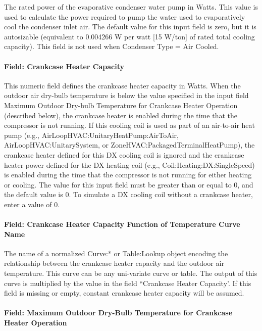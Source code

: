 The rated power of the evaporative condenser water pump in Watts. This value is used to calculate the power required to pump the water used to evaporatively cool the condenser inlet air. The default value for this input field is zero, but it is autosizable (equivalent to 0.004266 W per watt {[}15 W/ton{]} of rated total cooling capacity). This field is not used when Condenser Type = Air Cooled.

\paragraph{Field: Crankcase Heater Capacity}\label{field-crankcase-heater-capacity-3}

This numeric field defines the crankcase heater capacity in Watts. When the outdoor air dry-bulb temperature is below the value specified in the input field Maximum Outdoor Dry-bulb Temperature for Crankcase Heater Operation (described below), the crankcase heater is enabled during the time that the compressor is not running. If this cooling coil is used as part of an air-to-air heat pump (e.g., AirLoopHVAC:UnitaryHeatPump:AirToAir, AirLoopHVAC:UnitarySystem, or ZoneHVAC:PackagedTerminalHeatPump), the crankcase heater defined for this DX cooling coil is ignored and the crankcase heater power defined for the DX heating coil (e.g., Coil:Heating:DX:SingleSpeed) is enabled during the time that the compressor is not running for either heating or cooling. The value for this input field must be greater than or equal to 0, and the default value is 0. To simulate a DX cooling coil without a crankcase heater, enter a value of 0.

\paragraph{Field: Crankcase Heater Capacity Function of Temperature Curve Name}

The name of a normalized Curve:* or Table:Lookup object encoding the relationship between the crankcase heater capacity and the outdoor air temperature. This curve can be any uni-variate curve or table. The output of this curve is multiplied by the value in the field ``Crankcase Heater Capacity'. If this field is missing or empty, constant crankcase heater capacity will be
assumed.

\paragraph{Field: Maximum Outdoor Dry-Bulb Temperature for Crankcase Heater Operation}\label{field-maximum-outdoor-dry-bulb-temperature-for-crankcase-heater-operation-3}

